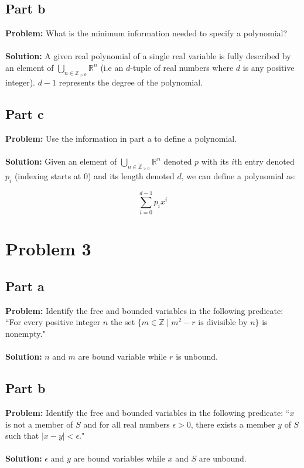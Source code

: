 \documentclass{article}
\begin{document}
\subsection{Part b}
\textbf{Problem:} What is the minimum information needed to specify a polynomial?
\\\\
\textbf{Solution:} A given real polynomial of a single real variable is fully described by an element of $\bigcup_{n\in\mathbb Z_{>0}}\mathbb R^{n}$ (i.e an $d$-tuple of real numbers where $d$ is any positive integer). $d-1$ represents the degree of the polynomial.

\subsection{Part c}
\textbf{Problem:} Use the information in part a to define a polynomial.
\\\\
\textbf{Solution:} Given an element of $\bigcup_{n\in\mathbb Z_{>0}}\mathbb R^{n}$ denoted $p$ with its $i$th entry denoted $p_i$ (indexing starts at 0) and its length denoted $d$, we can define a polynomial as:

$$\sum_{i=0}^{d-1}p_ix^i$$

\section{Problem 3}
\subsection{Part a}
\textbf{Problem:} Identify the free and bounded variables in the following predicate: ``For every positive integer $n$ the set $\{m\in\mathbb Z\mid m^2-r \text{ is divisible by $n$}\}$ is nonempty."
\\\\
\textbf{Solution:} $n$ and $m$ are bound variable while $r$ is unbound.

\subsection{Part b}
\textbf{Problem:} Identify the free and bounded variables in the following predicate: ``$x$ is not a member of $S$ and for all real numbers $\epsilon > 0$, there exists a member $y$ of $S$ such that $|x-y|<\epsilon$."
\\\\
\textbf{Solution:} $\epsilon$ and $y$ are bound variables while $x$ and $S$ are unbound.
\end{document}
